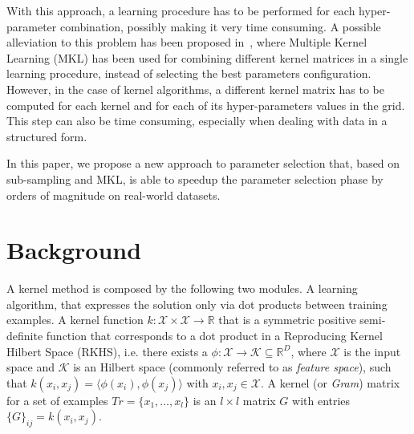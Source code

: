 \documentclass{esannV2}
\newcommand{\1}{{\bf 1}}
\begin{document}
With this approach, a learning procedure has to be performed for each hyper-parameter combination, possibly making it very time consuming.
A possible alleviation to this problem has been proposed in~\cite{Massimo2016}, where Multiple Kernel Learning (MKL) has been used for combining different kernel matrices in a single learning procedure, instead of selecting the best parameters configuration.
However, in the case of kernel algorithms, a different kernel matrix has to be computed for each kernel and for each of its hyper-parameters values in the grid. This step can also be time consuming, especially when dealing with data in a structured form.

In this paper, we propose a new approach to parameter selection that, based on sub-sampling and MKL, is able to speedup the parameter selection phase by orders of magnitude on real-world datasets.

\section{Background}
A kernel method is composed by the following two modules.
A learning algorithm, that expresses the solution only via dot products between training examples.
A kernel function ${k}: \mathcal{X} \times \mathcal{X} \rightarrow \mathbb{R}$ that is a symmetric positive semi-definite function that corresponds to a dot product in a Reproducing Kernel Hilbert Space (RKHS), i.e. there exists a $\phi: \mathcal{X} \rightarrow \mathcal{K} \subseteq \mathbb{R}^D$, where $\mathcal{X}$ is the input space and $\mathcal{K}$ is an Hilbert space (commonly referred to as \textit{feature space}), such that $k(x_i,x_j) = \langle \phi(x_i),\phi(x_j) \rangle$ with $x_i,x_j \in \mathcal{X}$. %
A kernel (or \textit{Gram}) matrix for a set of examples $Tr=\{x_1, \ldots, x_l\}$ is an $l \times l$ matrix $G$ with entries $\{G\}_{ij}=k(x_i,x_j)$.
\end{document}
